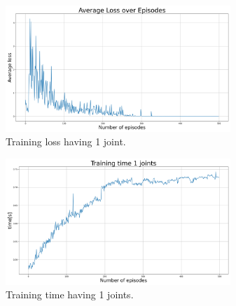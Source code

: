 \documentclass[twocolumn, a4paper]{article}
\begin{document}
\label{fig:TrainLoss1}
\begin{figure}[H]
	\centering
	\includegraphics[width=8.5cm]{"../Figures/average_loss_over_epiodes_1J_500E_256EL.png"}
	\caption{Training loss having 1 joint.}
\end{figure}
\vspace{-1cm}
\label{fig:TrainTime1}
\begin{figure}[H]
	\centering
	\includegraphics[width=8.5cm]{"../Figures/training_time_over_epiodes_1J_500E_256EL.png"}
	\caption{Training time having 1 joints.}
\end{figure}
\end{document}
